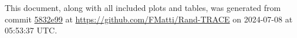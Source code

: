 This document, along with all included plots and tables, was generated from commit \href{https://github.com/FMatti/Rand-TRACE/tree/5832e99}{5832e99} at \url{https://github.com/FMatti/Rand-TRACE} on 2024-07-08 at 05:53:37 UTC.
